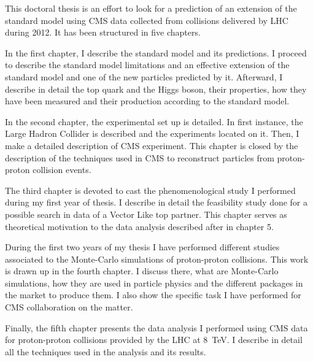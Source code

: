This doctoral thesis is an effort to look for a prediction of an extension of the standard model using CMS data collected from collisions delivered by LHC during 2012. It has been structured in five chapters.

In the first chapter, I describe the standard model and its predictions. I proceed to describe the standard model limitations and an effective extension of the standard model and one of the new particles predicted by it. Afterward, I describe in detail the top quark and the Higgs boson, their properties, how they have been measured and their production according to the standard model.

In the second chapter, the experimental set up is detailed. In first instance, the Large Hadron Collider is described and the experiments located on it. Then, I make a detailed description of CMS experiment. This chapter is closed by the description of the techniques used in CMS to reconstruct particles from proton-proton collision events. 

The third chapter is devoted to cast the phenomenological study I performed during my first year of thesis. I describe in detail the feasibility study done for a possible search in data of a Vector Like top partner. This chapter serves as theoretical motivation to the data analysis described after in chapter 5.

During the first two years of my thesis I have performed different studies associated to the Monte-Carlo simulations of proton-proton collisions. This work is drawn up in the fourth chapter. I discuss there, what are Monte-Carlo simulations, how they are used in particle physics and the different packages in the market to produce them. I also show the specific task I have performed for CMS collaboration on the matter.

Finally, the fifth chapter presents the data analysis I performed using CMS data for proton-proton collisions provided by the LHC at 8~TeV. I describe in detail all the techniques used in the analysis and its results.